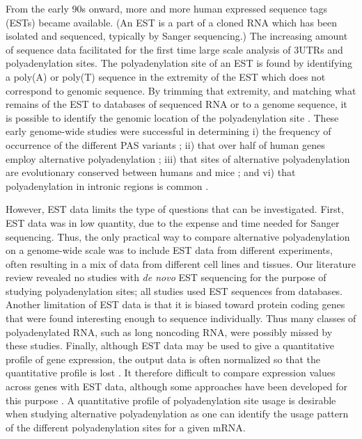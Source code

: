 From the early 90s onward, more and more human expressed sequence tags (ESTs)
became available. (An EST is a part of a cloned RNA which has been isolated and
sequenced, typically by Sanger sequencing.) The increasing amount of sequence
data facilitated for the first time large scale analysis of 3\ppp UTRs and
polyadenylation sites. The polyadenylation site of an EST is found by
identifying a poly(A) or poly(T) sequence in the extremity of the EST which
does not correspond to genomic sequence. By trimming that extremity, and
matching what remains of the EST to databases of sequenced RNA or to a genome
sequence, it is possible to identify the genomic location of the
polyadenylation site \cite{beaudoing_patterns_2000, tian_large-scale_2005}.
These early genome-wide studies were successful in determining i) the frequency
of occurrence of the different PAS variants \cite{beaudoing_patterns_2000}; ii)
that over half of human genes employ alternative polyadenylation
\cite{tian_large-scale_2005}; iii) that sites of alternative polyadenylation
are evolutionary conserved between humans and mice
\cite{tian_large-scale_2005}; and vi) that polyadenylation in intronic regions
is common \cite{tian_widespread_2007}.

However, EST data limits the type of questions that can be investigated. First,
EST data was in low quantity, due to the expense and time needed for Sanger
sequencing. Thus, the only practical way to compare alternative polyadenylation
on a genome-wide scale was to include EST data from different experiments,
often resulting in a mix of data from different cell lines and tissues. Our
literature review revealed no studies with \textit{de novo} EST sequencing for
the purpose of studying polyadenylation sites; all studies used EST sequences
from databases. Another limitation of EST data is that it is biased toward
protein coding genes that were found interesting enough to sequence
individually. Thus many classes of polyadenylated RNA, such as long noncoding
RNA, were possibly missed by these studies. Finally, although EST data may be
used to give a quantitative profile of gene expression, the output data is
often normalized so that the quantitative profile is lost
\cite{liu_quantitative_2006}. It therefore difficult to compare expression
values across genes with EST data, although some approaches have been developed
for this purpose \cite{liu_quantitative_2006}. A quantitative profile of
polyadenylation site usage is desirable when studying alternative
polyadenylation as one can identify the usage pattern of the different
polyadenylation sites for a given mRNA.

